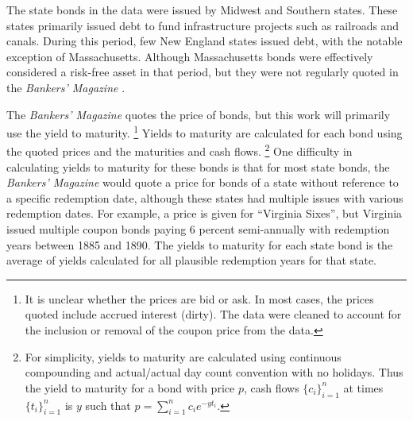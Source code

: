 \documentclass[]{article}\usepackage[]{graphicx}\usepackage[]{color}
\begin{document}
The state bonds in the data were issued by Midwest and Southern states.
These states primarily issued debt to fund infrastructure projects such as railroads and canals.
During this period, few New England states issued debt, with the notable exception of Massachusetts.
Although Massachusetts bonds were effectively considered a risk-free asset in that period, but they were not regularly quoted in the \textit{Bankers' Magazine} \parencites[86]{Martin1871}{HomerSylla2005}{Macaulay1938}[80-85]{Officer2003}.

The \textit{Bankers' Magazine} quotes the price of bonds, but this work will primarily use the yield to maturity.%
\footnote{
  It is unclear whether the prices are bid or ask. In most cases, the prices quoted include accrued interest (dirty).
  The data were cleaned to account for the inclusion or removal of the coupon price from the data.
}
Yields to maturity are calculated for each bond using the quoted prices and the maturities and cash flows.
\footnote{
  For simplicity, yields to maturity are calculated using continuous compounding and actual/actual day count convention with no holidays.
  Thus the yield to maturity for a bond with price $p$, cash flows $\{c_{i}\}_{i = 1}^{n}$ at times $\{t_{i}\}_{i=1}^{n}$ is $y$ such that $p = \sum_{i=1}^{n} c_{i} e^{- y t_{i}}$.
}
One difficulty in calculating yields to maturity for these bonds is that for most state bonds, the \textit{Bankers' Magazine} would quote a price for bonds of a state without reference to a specific redemption date, although these states had multiple issues with various redemption dates.
For example, a price is given for ``Virginia Sixes'', but Virginia issued multiple coupon bonds paying 6 percent semi-annually with redemption years between 1885 and 1890.
The yields to maturity for each state bond is the average of yields calculated for all plausible redemption years for that state.

\end{document}
